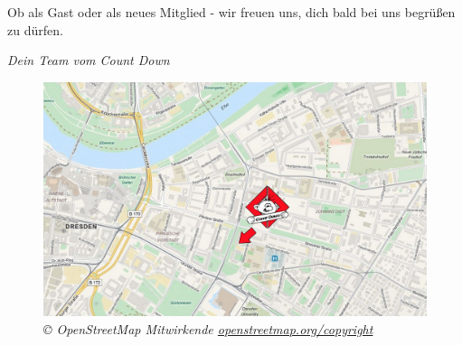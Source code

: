 Ob als Gast oder als neues Mitglied - wir freuen uns, dich bald bei uns begrüßen zu dürfen.

\textit{Dein Team vom Count Down}

\vfill

\begin{figure}[h!]
\centering
\includegraphics[width=\linewidth]{img/lageplancd.png}
\caption*{\small \textit{© OpenStreetMap Mitwirkende \href{https://openstreetmap.org/copyright}{openstreetmap.org/copyright}}}
\end{figure}
